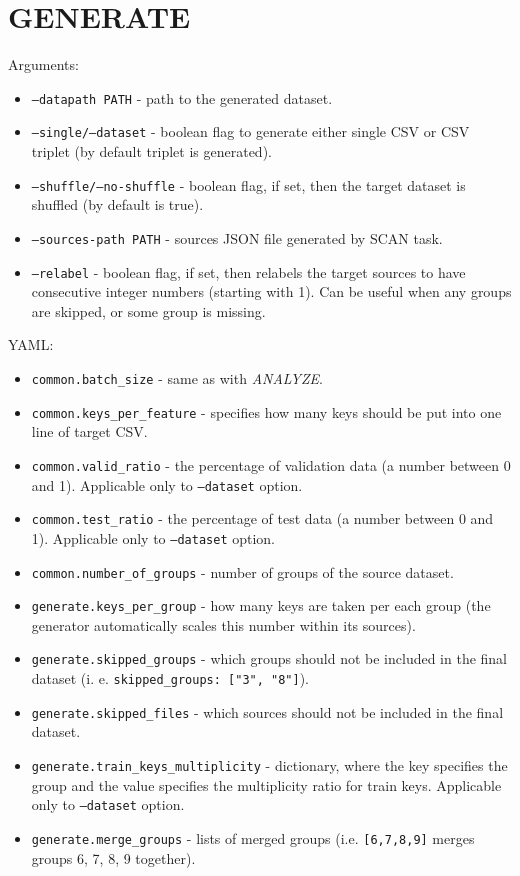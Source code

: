 \section{GENERATE}
\label{appendix-generate}

\noindent
Arguments:

\begin{itemize}

\item \texttt{--datapath PATH} - path to the generated dataset.
\item \texttt{--single/--dataset} - boolean flag to generate either single CSV or CSV triplet (by default triplet is generated).
\item \texttt{--shuffle/--no-shuffle} - boolean flag, if set, then the target dataset is shuffled (by default is true).
\item \texttt{--sources-path PATH} - sources JSON file generated by SCAN task.
\item \texttt{--relabel} - boolean flag, if set, then relabels the target sources to have consecutive integer numbers (starting with 1).  Can be useful when any groups are skipped, or some group is missing.

\end{itemize}

\noindent
YAML:

\begin{itemize}

\item \texttt{common.batch\_size} - same as with \textit{ANALYZE}.
\item \texttt{common.keys\_per\_feature} -  specifies how many keys should be put into one line of target CSV.
\item \texttt{common.valid\_ratio} - the percentage of validation data (a number between 0 and 1). Applicable only to \texttt{--dataset} option.
\item \texttt{common.test\_ratio} - the percentage of test data (a number between 0 and 1). Applicable only to \texttt{--dataset} option.
\item \texttt{common.number\_of\_groups} - number of groups of the source dataset.
\item \texttt{generate.keys\_per\_group} - how many keys are taken per each group (the generator automatically scales this number within its sources).
\item \texttt{generate.skipped\_groups} - which groups should not be included in the final dataset (i. e. \texttt{skipped\_groups: ["3", "8"]}).
\item \texttt{generate.skipped\_files} - which sources should not be included in the final dataset.
\item \texttt{generate.train\_keys\_multiplicity} - dictionary, where the key specifies the group and the value specifies the multiplicity ratio for train keys. Applicable only to \texttt{--dataset} option.
\item \texttt{generate.merge\_groups} - lists of merged groups (i.e. \texttt{[6,7,8,9]}  merges groups 6, 7, 8, 9 together).

\end{itemize}

